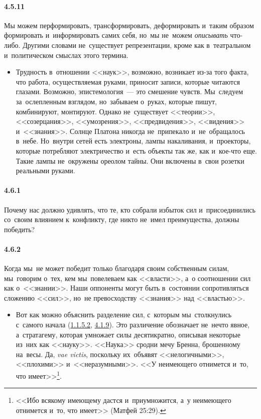 \paragraph{4.5.11}\hypertarget{par:4.5.11}{}Мы можем перформировать, трансформировать, деформировать и~таким образом формировать и~информировать самих себя, но~мы не~можем {\itshape описывать} что-либо. Другими словами не~существует репрезентации, кроме как в~театральном и~политическом смыслах этого термина. 
	\begin{itemize}
	\item 
	Трудность в~отношении <<наук>>, возможно, возникает из-за того факта, что работа, осуществляемая руками, приносит записи, которые читаются глазами. Возможно, эпистемология~--- это смешение чувств. Мы~следуем за~ослепленным взглядом, но~забываем о~руках, которые пишут, комбинируют, монтируют. Однако не~существует <<теории>>, <<созерцания>>, <<умозрения>>, <<предвидения>>, <<видения>> и~<<знания>>. Солнце Платона никогда не~припекало и~не~обращалось в~небе. Но~внутри сетей есть электроны, лампы накаливания, и~проекторы, которые потребляют электричество и~есть объекты так же, как и~кое-что еще. Такие лампы не~окружены ореолом тайны. Они включены в~свои розетки реальными руками.
	\end{itemize}	


\paragraph{4.6.1}\hypertarget{par:4.6.1}{} Почему нас должно удивлять, что те, кто собрали избыток сил и~присоединились со~своим влиянием к~конфликту, где никто не~имел преимущества, должны победить?


\paragraph{4.6.2}\hypertarget{par:4.6.2}{} Когда мы~не может победит только благодаря своим собственным силам, мы~говорим о~тех, кем мы~повелеваем как <<власти>>, а~о соотношении сил как о~<<знании>>. Наши оппоненты могут быть в~состоянии сопротивляться сложению <<сил>>, но~не превосходству <<знания>> над <<властью>>.
	\begin{itemize}
	\item 
	Вот как можно объяснить разделение сил, с~которым мы~столкнулись с~самого начала (\hyperlink{par:1.1.5.2}{1.1.5.2}, \hyperlink{par:4.1.9}{4.1.9}). Это различение обозначает не~нечто явное, а~стратагему, которая умножает силы десятикратно, описывая некоторые из~них как <<науку>>. <<Наука>> сродни мечу Бренна, брошенному на~весы. Да, {\itshape vae victis}, поскольку их~объявят <<нелогичными>>, <<плохими>> и~<<неразумными>>. <<У неимеющего отнимется и~то, что имеет>>\footnote{<<Ибо всякому имеющему дастся и~приумножится, а~у неимеющего отнимется и~то, что имеет>> (Матфей 25:29).}. 
	\end{itemize}	

